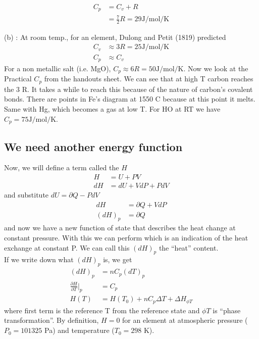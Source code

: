 \documentclass[12pt]{article}
\begin{document}
\begin{align*}
C_p &= C_v + R\\
&= \frac{7}{2} R =  29 \text{J}/\text{mol}/\text{K}
\end{align*}

(b) : At room temp., for an element, Dulong and Petit (1819) predicted
\begin{align*}
C_v &\approx 3 R = 25 \text{J}/\text{mol}/\text{K}\\
C_p & \approx C_v
\end{align*}
For a non metallic salt (i.e. MgO), $C_p \approx 6 R = 50\text{J}/\text{mol}/\text{K}$.  Now we look at the Practical $C_p$ from the handouts sheet.  We can see that at high T carbon reaches the 3 R.  It takes a while to reach this because of the nature of carbon's covalent bonds.  There are points in Fe's diagram at 1550 \degree C because at this point it melts.  Same with Hg, which becomes a gas at low T.  For H\2O at RT we have $C_p = 75 \text{J}/\text{mol}/\text{K}$.

\subsection{We need another energy function}
Now, we will define a term called the  $H$
\begin{align*}
H &= U + PV\\
dH &= dU + V dP + P dV
\end{align*}
and substitute $dU = \partial Q - P dV$
\begin{align*}
dH &= \partial Q + V dP\\
(dH)_p &= \partial Q
\end{align*}
and now we have a new function of state that describes the heat change at constant pressure.  With this we can perform  which is an indication of the heat exchange at constant P.  We can call this $(dH)_p$ the ``heat'' content.\\

If we write down what $(dH)_p$ is, we get
\begin{align*}
(dH)_p &= n C_p (dT)_p\\
\frac{\partial H}{\partial T}|_p &= C_p\\
H(T) &= H(T_0) + n C_p \Delta T + \Delta H_{\phi T}
\end{align*}
where first term is the reference T from the reference state and $\phi T$ is ``phase transformation''.  By definition, $H=0$ for an element at atmospheric pressure ($P_0 = 101325$ Pa) and temperature ($T_0 = 298$ K).\\
\end{document}
